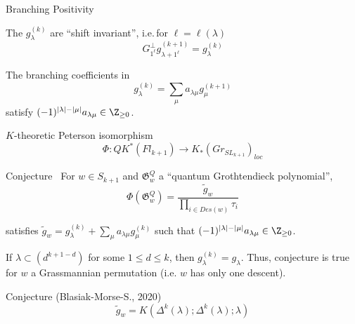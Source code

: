 \documentclass{beamer}
\newcommand{\G}{\mathfrak{G}}
\begin{document}
\begin{frame}{Branching Positivity}
  \begin{theorem}
    \pause
    The \(g_\lambda^{(k)}\) are ``shift
        invariant'', i.e.\,for \(\ell = \ell(\lambda)\)
      \[
        G_{1^\ell}^\perp g_{\lambda+1^\ell}^{(k+1)} = g_\lambda^{(k)}
      \]
  \end{theorem}\pause
  \begin{theorem}
    The branching coefficients in 
    \[
      g_\lambda^{(k)} = \sum_\mu a_{\lambda \mu} g_\mu^{(k+1)}
    \]
    satisfy \((-1)^{|\lambda|-|\mu|}a_{\lambda \mu} \in \Z_{\geq 0}\).
  \end{theorem}
\end{frame}
\begin{frame}{\(K\)-theoretic Peterson isomorphism}
  \vspace{-0.2in}
   \[
    \Phi \colon QK^*(Fl_{k+1}) \to K_*(Gr_{SL_{k+1}})_{loc}
  \]
  \pause
  \vspace{-0.2in}
  \begin{block}{Conjecture~\cite{IIM}}
    For \(w \in S_{k+1}\) and \(\G_w^Q\) a ``quantum Grothtendieck
    polynomial'',
    \vspace{-0.1in}
    \[
      \Phi(\G_w^Q) = \frac{\tilde{g}_w}{\prod_{i \in Des(w)} \tau_i}
    \]

    \pause
    satisfies \(\tilde{g}_w = g_\lambda^{(k)} + \sum_\mu a_{\lambda
      \mu} g_\mu^{(k)}\) such that \((-1)^{|\lambda|-|\mu|}a_{\lambda
      \mu} \in \Z_{\geq 0}\).
  \end{block}\pause
  \begin{theorem}
    If \(\lambda \subset (d^{k+1-d})\) for some \(1 \leq d \leq k\),
    then \(g_\lambda^{(k)} = g_\lambda\). Thus, conjecture is true
    for \(w\) a Grassmannian permutation (i.e. \(w\) has only one descent).
  \end{theorem}\pause
  \begin{block}{Conjecture (Blasiak-Morse-S., 2020)}
    \[\tilde{g}_w = K(\Delta^k(\lambda);\Delta^k(\lambda);\lambda)\]
  \end{block}
\end{frame}
\end{document}
